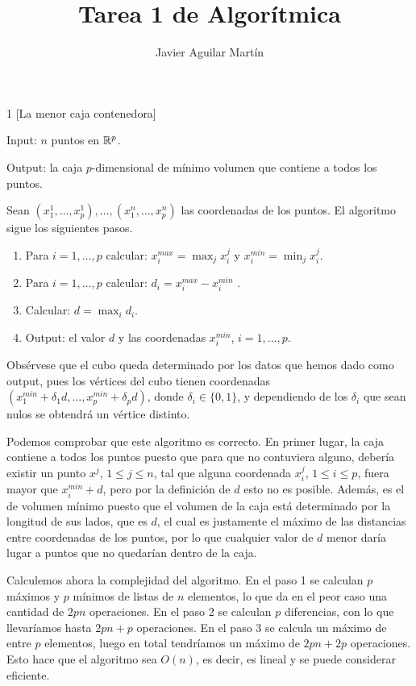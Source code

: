 \documentclass[twoside]{article}
\begin{document}
\title{Tarea 1 de Algorítmica}
\author{Javier Aguilar Martín}
\maketitle


\begin{ejercicio}{1}
[La menor caja contenedora]\

Input: $n$ puntos en $\mathbb{R}^p$. 

Output: la caja $p$-dimensional de mínimo volumen que contiene a todos los puntos. 
\end{ejercicio}
\begin{solucion}
Sean $(x_1^1,\dots, x_p^1),\dots, (x_1^n,\dots, x_p^n)$ las coordenadas de los puntos. El algoritmo sigue los siguientes pasos.

\begin{enumerate}
\item Para $i=1,\dots, p$ calcular: $x^{max}_i=\max_j x_i^j$ y $x^{min}_i=\min_j x_i^j$.
\item Para $i=1,\dots, p$ calcular: $d_i=x^{max}_i-x^{min}_i$ .
\item Calcular: $d=\max_i d_i$.
\item Output: el valor $d$ y las coordenadas $x^{min}_i$, $i=1,\dots, p$. 
\end{enumerate}
Obsérvese que el cubo queda determinado por los datos que hemos dado como output, pues los vértices del cubo tienen coordenadas $(x^{min}_1+\delta_1 d,\dots, x^{min}_p+\delta_p d)$, donde $\delta_i\in \{0,1\}$, y dependiendo de los $\delta_i$ que sean nulos se obtendrá un vértice distinto.

Podemos comprobar que este algoritmo es correcto. En primer lugar, la caja contiene a todos los puntos puesto que para que no contuviera alguno, debería existir un punto $x^j$, $1\leq j\leq n$, tal que alguna coordenada $x^j_i$, $1\leq i\leq p$, fuera mayor que $x^{min}_i+d$, pero por la definición de $d$ esto no es posible. Además, es el de volumen mínimo puesto que el volumen de la caja está determinado por la longitud de sus lados, que es $d$, el cual es justamente el máximo de las distancias entre coordenadas de los puntos, por lo que cualquier valor de $d$ menor daría lugar a puntos que no quedarían dentro de la caja.


Calculemos ahora la complejidad del algoritmo. En el paso 1 se calculan $p$ máximos y $p$ mínimos de listas de $n$ elementos, lo que da en el peor caso una cantidad de $2pn$ operaciones.  En el paso 2 se calculan $p$ diferencias, con lo que llevaríamos hasta $2pn+p$ operaciones. En el paso 3 se calcula un máximo de entre $p$ elementos, luego en total tendríamos un máximo de $2pn+2p$ operaciones. Esto hace que el algoritmo sea $O(n)$, es decir, es lineal y se puede considerar eficiente. 
\end{solucion}
\end{document}
